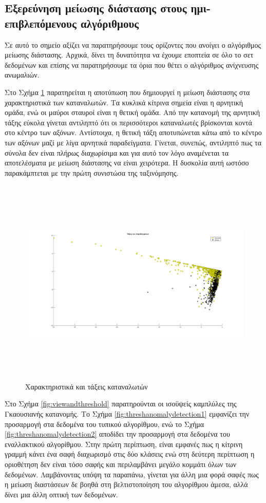 \subsection{Εξερεύνηση μείωσης διάστασης στους ημι-επιβλεπόμενους αλγόριθμους}
Σε αυτό το σημείο αξίζει να παρατηρήσουμε τους ορίζοντες που ανοίγει ο αλγόριθμος μείωσης διάστασης. Αρχικά, δίνει τη δυνατότητα να έχουμε εποπτεία σε όλο το σετ δεδομένων και επίσης να παρατηρήσουμε τα όρια που θέτει ο αλγόριθμος ανίχνευσης ανωμαλιών.\par
Στο Σχήμα \ref{fig:charclasscons} παρατηρείται η αποτύπωση που δημιουργεί η μείωση διάστασης στα χαρακτηριστικά των καταναλωτών. Τα κυκλικά κίτρινα σημεία είναι η αρνητική ομάδα, ενώ οι μαύροι σταυροί είναι η θετική ομάδα. Από την κατανομή της αρνητική τάξης εύκολα γίνεται αντιληπτό ότι οι περισσότεροι καταναλωτές βρίσκονται κοντά στο κέντρο των αξόνων. Αντίστοιχα, η θετική τάξη αποτυπώνεται κάτω από το κέντρο των αξόνων μαζί με λίγα αρνητικά παραδείγματα. Γίνεται, συνεπώς, αντιληπτό πως τα σύνολα δεν είναι πλήρως διαχωρίσιμα και για αυτό τον λόγο αναμένεται τα αποτελέσματα με μείωση διάστασης να είναι χειρότερα. Η δυσκολία αυτή ωστόσο παρακάμπτεται με την πρώτη συνιστώσα της ταξινόμησης.\par
\begin{figure}[ht!]
 \includegraphics[width=160mm, height=100mm]{../../plots/gr_class_semi_sup.png}
\caption{Χαρακτηριστικά και τάξεις καταναλωτών}
\label{fig:charclasscons}
\end{figure}
\newpage
Στο Σχήμα \ref{fig:viewandthreshold} παρατηρούνται οι ισοϋψείς καμπλύλες της Γκαουσιανής κατανομής. Το Σχήμα \ref{fig:threshanomalydetection1} εμφανίζει την προσαρμογή στα δεδομένα του τυπικού αλγορίθμου, ενώ το Σχήμα \ref{fig:threshanomalydetection2} αποδίδει την προσαρμογή στα δεδομένα του εναλλακτικού αλγορίθμου. Στην πρώτη περίπτωση, είναι εμφανές πως η κίτρινη γραμμή κάνει ένα σαφή διαχωρισμό στις δύο κλάσεις ενώ στη δεύτερη περίπτωση η οριοθέτηση δεν είναι τόσο σαφής και περιλαμβάνει μεγάλο κομμάτι όλων των δεδομένων. Λαμβάνοντας υπόψη τα παραπάνω, γίνεται για άλλη μια φορά σαφές πως η μείωση διαστάσεων δε βοηθά στη βελτιστοποίηση του αλγορίθμου άμεσα, αλλά δίνει μια άλλη οπτική των δεδομένων.\par
